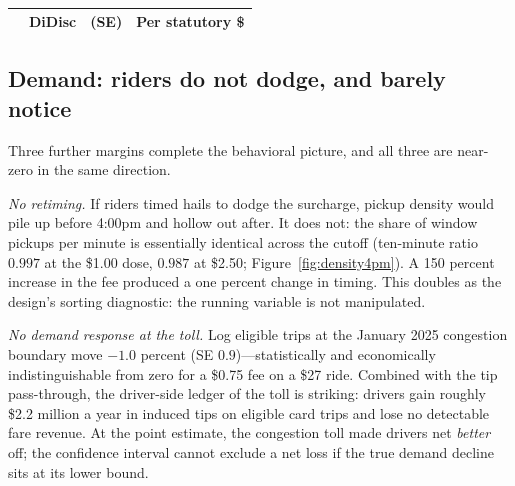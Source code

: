 \begin{table}[!htbp]
  \centering
  \singlespacing
  \caption{}
  \label{tab:decomp}
  \small
  \begin{tabular}{@{}lccc@{}}
    \toprule
    & DiDisc & (SE) & Per statutory \$ \\
    \midrule
    
    \bottomrule
  \end{tabular}
\end{table}

\subsection{Demand: riders do not dodge, and barely notice}
\label{sec:results-demand}
Three further margins complete the behavioral picture, and all three are
near-zero in the same direction.

\emph{No retiming.} If riders timed hails to dodge the surcharge, pickup
density would pile up before 4:00pm and hollow out after. It does not:
the share of window pickups per minute is essentially identical across
the cutoff (ten-minute ratio $0.997$ at the \$1.00 dose, $0.987$ at
\$2.50; Figure~\ref{fig:density4pm}). A 150 percent increase in the fee
produced a one percent change in timing. This doubles as the design's
sorting diagnostic: the running variable is not manipulated.

\emph{No demand response at the toll.} Log eligible trips at the January
2025 congestion boundary move $-1.0$ percent (SE $0.9$)---statistically
and economically indistinguishable from zero for a \$0.75 fee on a
\$27 ride. Combined with the tip pass-through, the driver-side ledger of
the toll is striking: drivers gain roughly \$2.2 million a year in
induced tips on eligible card trips and lose no detectable fare revenue.
At the point estimate, the congestion toll made drivers net
\emph{better} off; the confidence interval cannot exclude a net loss if
the true demand decline sits at its lower bound.

